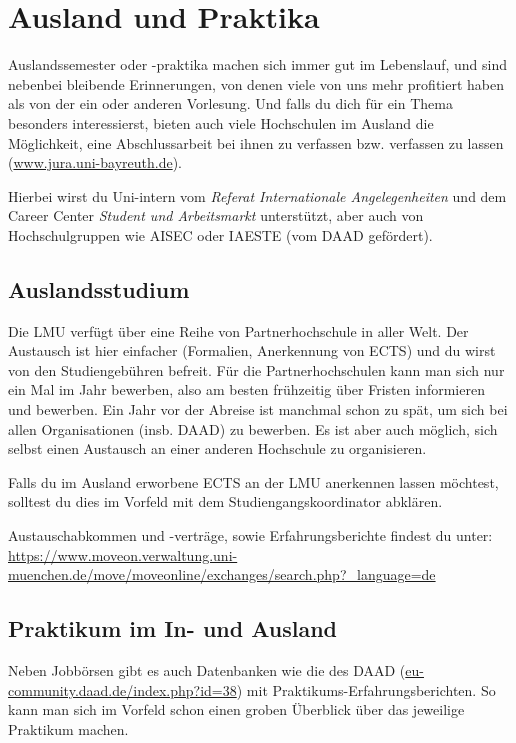 ﻿
\section{Ausland und Praktika}

Auslandssemester oder -praktika machen sich immer gut im Lebenslauf,
und sind nebenbei bleibende Erinnerungen, von denen viele von uns mehr
profitiert haben als von der ein oder anderen Vorlesung.  Und falls du
dich für ein Thema besonders interessierst, bieten auch viele
Hochschulen im Ausland die Möglichkeit, eine Abschlussarbeit bei ihnen
zu verfassen bzw. verfassen zu lassen (\url{www.jura.uni-bayreuth.de}).

Hierbei wirst du Uni-intern vom \emph{Referat Internationale Angelegenheiten} und dem Career Center \emph{Student und Arbeitsmarkt} unterstützt, aber auch von Hochschulgruppen wie AISEC oder IAESTE (vom DAAD gefördert).

\subsection{Auslandsstudium}

Die LMU verfügt über eine Reihe von Partnerhochschule in aller
Welt. Der Austausch ist hier einfacher (Formalien, Anerkennung von
ECTS) und du wirst von den Studiengebühren befreit. Für die
Partnerhochschulen kann man sich nur ein Mal im Jahr bewerben, also am
besten frühzeitig über Fristen informieren und bewerben.
Ein Jahr vor der Abreise ist manchmal schon zu spät, um sich bei
allen Organisationen (insb. DAAD) zu bewerben.
Es ist aber auch möglich, sich selbst einen Austausch an einer anderen
Hochschule zu organisieren.

Falls du im Ausland erworbene ECTS an der LMU anerkennen lassen
möchtest, solltest du dies im Vorfeld mit dem Studiengangskoordinator
abklären.

Austauschabkommen und -verträge, sowie Erfahrungsberichte findest du unter:\\
\url{https://www.moveon.verwaltung.uni-muenchen.de/move/moveonline/exchanges/search.php?_language=de}

\subsection{Praktikum im In- und Ausland}

Neben Jobbörsen gibt es auch Datenbanken wie die des DAAD
(\url{eu-community.daad.de/index.php?id=38}) mit
Praktikums-Erfahrungsberichten. So kann man sich im Vorfeld schon
einen groben Überblick über das jeweilige Praktikum machen.

